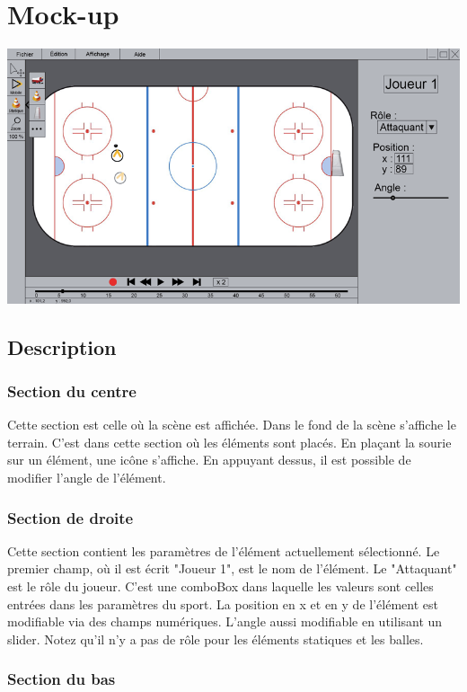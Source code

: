 \chapter{Mock-up}
\label{s:mockup}


\includegraphics[scale=0.55]{mockup/mockup.png}

\section{Description}

\subsection{Section du centre}

Cette section est celle où la scène est affichée. Dans le fond de la scène s'affiche le terrain. C'est dans cette section où les éléments sont placés. En plaçant la sourie sur un élément, une icône s'affiche. En appuyant dessus, il est possible de modifier l'angle de l'élément.

\subsection{Section de droite}

Cette section contient les paramètres de l'élément actuellement sélectionné. Le premier champ, où il est écrit "Joueur 1", est le nom de l'élément. Le "Attaquant" est le rôle du joueur. C'est une comboBox dans laquelle les valeurs sont celles entrées dans les paramètres du sport. La position en x et en y de l'élément est modifiable via des champs numériques. L'angle aussi modifiable en utilisant un slider. Notez qu'il n'y a pas de rôle pour les éléments statiques et les balles.

\subsection{Section du bas}

